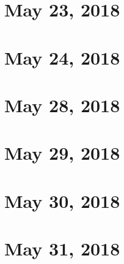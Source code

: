\documentclass{article}
\begin{document}

\section{May 23, 2018}
\newpage


\section{May 24, 2018}
\newpage


\section{May 28, 2018}
\newpage


\section{May 29, 2018}
\newpage


\section{May 30, 2018}
\newpage


\section{May 31, 2018}
\newpage

\end{document}
